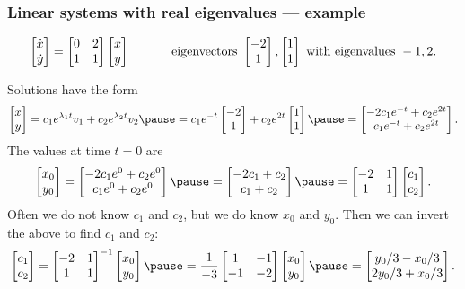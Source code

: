 \documentclass[9pt]{beamer}
\begin{document}
\begin{frame}[t]
 \frametitle{Linear systems with real eigenvalues --- example}

 \[ \left[\begin{matrix} \dot{x}\\\dot{y}\end{matrix}\right] = \left[\begin{matrix} 0&2\\ 1&1\end{matrix}\right]\left[\begin{matrix} x\\ y\end{matrix}\right]
    \hspace{3em}
    \text{ eigenvectors } \left[\begin{matrix} -2\\ 1\end{matrix}\right],\left[\begin{matrix} 1 \\ 1\end{matrix}\right]
    \text{ with eigenvalues } -1,2.
 \]

 \reminderbar

 Solutions have the form 
 \[ \bbm x \\ y \ebm = 
    c_1e^{\lm_1t}v_1 + c_2e^{\lm_2t}v_2 \pause =
    c_1e^{-t}\bbm -2\\ 1\ebm + c_2e^{2t}\bbm 1\\1\ebm \pause =
    \bbm -2c_1e^{-t} + c_2e^{2t} \\
         c_1e^{-t} + c_2e^{2t} \ebm.
 \]\pause 
 The values at time $t=0$ are 
 \[ \bbm x_0 \\ y_0 \ebm = 
    \bbm -2c_1e^{0} + c_2e^{0} \\
         c_1e^{0} + c_2e^{0} \ebm \pause =
    \bbm -2c_1 + c_2 \\ c_1 + c_2 \ebm \pause = 
    \bbm -2 & 1 \\ 1 & 1 \ebm \bbm c_1 \\ c_2 \ebm.
 \]\pause
 Often we do not know $c_1$ and $c_2$, but we do know $x_0$ and
 $y_0$.  \pause
 Then we can invert the above to find $c_1$ and $c_2$:
 \[ \bbm c_1 \\ c_2 \ebm = 
    \bbm -2 & 1 \\ 1 & 1 \ebm^{-1} \bbm x_0 \\ y_0 \ebm \pause = 
    \frac{1}{-3} \bbm 1 & -1 \\ -1 & -2 \ebm \bbm x_0 \\ y_0 \ebm
    \pause =
    \bbm y_0/3 - x_0/3 \\ 2y_0/3 + x_0/3 \ebm.
 \]
\end{frame}
\end{document}
